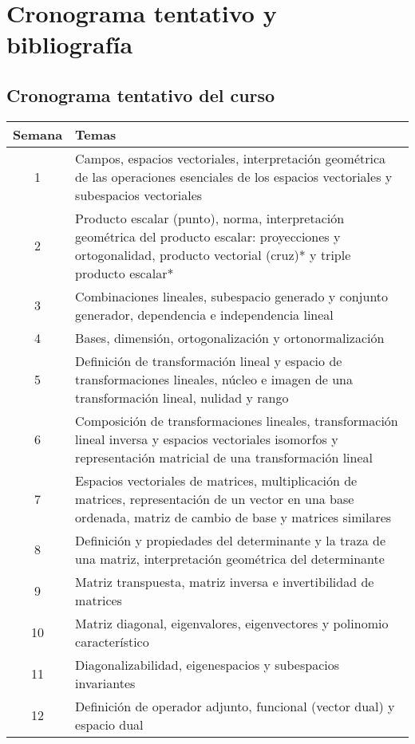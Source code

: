 \documentclass[12pt]{article}
\begin{document}
\section{Cronograma tentativo y bibliografía}

\subsection{Cronograma tentativo del curso}

\begin{table}[ht]
    \centering
    \begin{tabularx}{\linewidth}{|c|X|}
    \hline Semana & Temas \\
    \hline 1 & Campos, espacios vectoriales, interpretación geométrica de las operaciones esenciales de los espacios vectoriales y subespacios vectoriales \\
    \hline 2 & Producto escalar (punto), norma, interpretación geométrica del producto escalar: proyecciones y ortogonalidad, producto vectorial (cruz)* y triple producto escalar* \\
    \hline 3 & Combinaciones lineales, subespacio generado y conjunto generador, dependencia e independencia lineal \\
    \hline 4 & Bases, dimensión, ortogonalización y ortonormalización \\
    \hline 5 & Definición de transformación lineal y espacio de transformaciones lineales, núcleo e imagen de una transformación lineal, nulidad y rango \\
    \hline 6 & Composición de transformaciones lineales, transformación lineal inversa y espacios vectoriales isomorfos y representación matricial de una transformación lineal \\
    \hline 7 & Espacios vectoriales de matrices, multiplicación de matrices, representación de un vector en una base ordenada, matriz de cambio de base y matrices similares \\
    \hline 8 & Definición y propiedades del determinante y la traza de una matriz, interpretación geométrica del determinante \\
    \hline 9 & Matriz transpuesta, matriz inversa e invertibilidad de matrices \\
    \hline 10 & Matriz diagonal, eigenvalores, eigenvectores y polinomio característico \\
    \hline 11 & Diagonalizabilidad, eigenespacios y subespacios invariantes \\
        \hline 12 & Definición de operador adjunto, funcional (vector dual) y espacio dual \\

\end{tabularx}
\end{table}
\end{document}
